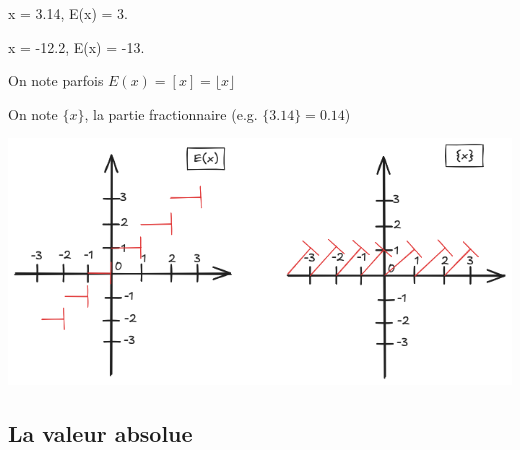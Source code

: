 \documentclass[a4paper, 12pt]{article}
\begin{document}
\begin{example}
    \item x = 3.14, E(x) = 3.
    \item x = -12.2, E(x) = -13.
\end{example}

\begin{remark}
    \item On note parfois $E(x) = [x] = \lfloor x \rfloor$
    \item On note $\{x\}$, la partie fractionnaire (e.g. $\{3.14\}=0.14$)
\end{remark}



\includegraphics[width=\textwidth]{images/Entier&fractionaire.png}

\subsection{La valeur absolue}
\end{document}
